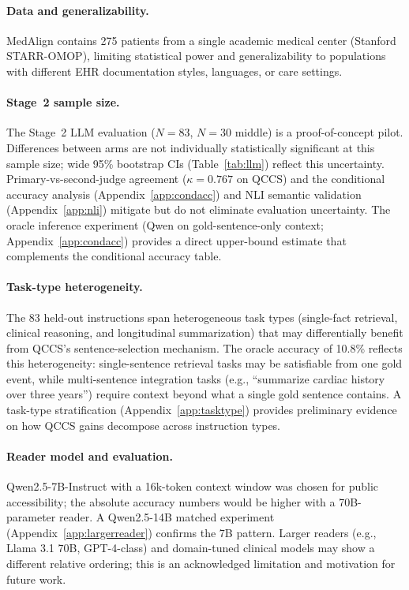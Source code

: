 \documentclass{article}
\begin{document}
\paragraph{Data and generalizability.}
MedAlign contains 275 patients from a single academic medical center (Stanford
STARR-OMOP), limiting statistical power and generalizability to populations with
different EHR documentation styles, languages, or care settings.

\paragraph{Stage~2 sample size.}
The Stage~2 LLM evaluation ($N{=}83$, $N{=}30$ middle) is a proof-of-concept pilot.
Differences between arms are not individually statistically significant at this sample
size; wide 95\% bootstrap CIs (Table~\ref{tab:llm}) reflect this uncertainty.
Primary-vs-second-judge agreement ($\kappa = 0.767$ on QCCS) and the conditional
accuracy analysis (Appendix~\ref{app:condacc}) and NLI semantic validation
(Appendix~\ref{app:nli}) mitigate but do not eliminate evaluation uncertainty.
The oracle inference experiment (Qwen on gold-sentence-only context;
Appendix~\ref{app:condacc}) provides a direct upper-bound estimate that complements
the conditional accuracy table.

\paragraph{Task-type heterogeneity.}
The 83 held-out instructions span heterogeneous task types (single-fact retrieval,
clinical reasoning, and longitudinal summarization) that may differentially benefit
from QCCS's sentence-selection mechanism. The oracle accuracy of 10.8\% reflects
this heterogeneity: single-sentence retrieval tasks may be satisfiable from one
gold event, while multi-sentence integration tasks (e.g., ``summarize cardiac history
over three years'') require context beyond what a single gold sentence contains.
A task-type stratification (Appendix~\ref{app:tasktype}) provides preliminary
evidence on how QCCS gains decompose across instruction types.

\paragraph{Reader model and evaluation.}
Qwen2.5-7B-Instruct with a 16k-token context window was chosen for public
accessibility; the absolute accuracy numbers would be higher with a 70B-parameter
reader. A Qwen2.5-14B matched experiment (Appendix~\ref{app:largerreader}) confirms
the 7B pattern. Larger readers (e.g., Llama 3.1 70B, GPT-4-class) and domain-tuned
clinical models may show a different relative ordering; this is an acknowledged
limitation and motivation for future work.
\end{document}
